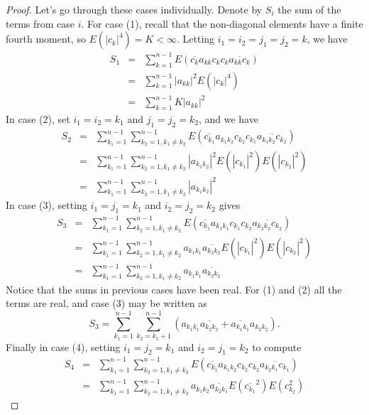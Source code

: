 \documentclass[12pt,a4paper,leqno]{report}
\theoremstyle{plain}
\theoremstyle{definition}
\theoremstyle{remark}
\begin{document}
\begin{proof}
Let's go through these cases individually. Denote by $S_i$ the sum of the terms from case $i$.
For case (1), recall that the non-diagonal elements have a finite fourth moment, so $E(|c_{k}|^4) = K < \infty$. Letting $i_1=i_2=j_1=j_2=k$, we have
\begin{eqnarray*}
S_1 & = & \sum_{k=1}^{n-1} E(\overline{c_{k}} a_{kk} c_{k}c_{k} \overline{a_{kk} c_{k}})\\
& = & \sum_{k=1}^{n-1} |a_{kk}|^2 E(|c_{k}|^4)\\
& = & \sum_{k=1}^{n-1} K |a_{kk}|^2
\end{eqnarray*}
In case (2), set $i_1=i_2=k_1$ and $j_1=j_2=k_2$, and we have 
\begin{eqnarray*}
S_2 & = & \sum_{k_1=1}^{n-1} \sum_{k_2=1, k_1\neq k_2}^{n-1} E(\overline{c_{k_1}} a_{k_1k_2} c_{k_2}c_{k_1} \overline{a_{k_1k_2} c_{k_2}})\\
& = & \sum_{k_1=1}^{n-1} \sum_{k_2=1, k_1\neq k_2}^{n-1} |a_{k_1k_2}|^2 E(|c_{k_1}|^2)  E(|c_{k_2}|^2)\\
& = & \sum_{k_1=1}^{n-1} \sum_{k_2=1, k_1\neq k_2}^{n-1} |a_{k_1k_2}|^2
\end{eqnarray*}
In case (3), setting $i_1=j_1=k_1$ and $i_2=j_2=k_2$ gives
\begin{eqnarray*}
S_3 & = & \sum_{k_1=1}^{n-1} \sum_{k_2=1, k_1\neq k_2}^{n-1} E(\overline{c_{k_1}} a_{k_1k_1} c_{k_1}c_{k_2} \overline{a_{k_2k_2} c_{k_2}})\\
& = & \sum_{k_1=1}^{n-1} \sum_{k_2=1, k_1\neq k_2}^{n-1} a_{k_1k_1} \overline{a_{k_2k_2}} E(|c_{k_1}|^2)  E(|c_{k_2}|^2)\\
& = & \sum_{k_1=1}^{n-1} \sum_{k_2=1, k_1\neq k_2}^{n-1} a_{k_1k_1} \overline{a_{k_2k_2}}
\end{eqnarray*}
Notice that the sums in previous cases have been real. For (1) and (2) all the terms are real, and case (3) may be written as
\begin{equation*}
S_3 = \sum_{k_1=1}^{n-1} \sum_{k_2=k_1+1}^{n-1} (a_{k_1k_1} \overline{a_{k_2k_2}}+ \overline{a_{k_1k_1}} a_{k_2k_2}).
\end{equation*}
Finally in case (4), setting $i_1=j_2=k_1$ and $i_2=j_1=k_2$ to compute
\begin{eqnarray*}
S_4 & = & \sum_{k_1=1}^{n-1}\sum_{k_2=1, k_1\neq k_2}^{n-1}
E(\overline{c_{k_1}} a_{k_1k_2} c_{k_2}c_{k_2} \overline{a_{k_2k_1} c_{k_1}})\\
& = & \sum_{k_1=1}^{n-1}\sum_{k_2=1, k_1 \neq k_2}^{n-1} a_{k_1k_2} \overline{a_{k_2k_1}}
E(\overline{c_{k_1}}^2) E( c_{k_2}^2)
\end{eqnarray*}

\end{proof}
\end{document}
